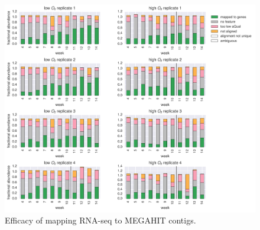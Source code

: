 \begin{figure}[H]
\centering
    \includegraphics[width=1.0\textwidth]{./tex/chapter2/figures/170316_fracs_mapped_unmapped_etc.pdf}
    \begin{singlespace}
    \caption[Efficacy of mapping RNA-seq to MEGAHIT contigs]{
        Efficacy of mapping RNA-seq to MEGAHIT contigs.}
    \label{fig:rna_mapping_bars}
    \end{singlespace}
\end{figure}

